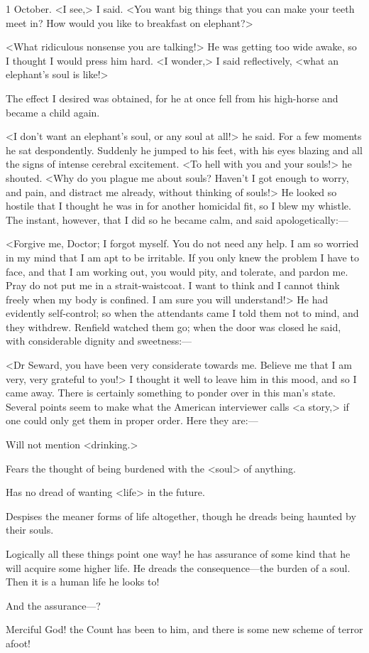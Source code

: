 \begin{diary}{1 October.}
<I see,> I said. <You want big things that you can make your teeth meet in? How would you like to breakfast on elephant?>

<What ridiculous nonsense you are talking!> He was getting too wide awake, so I thought I would press him hard. <I wonder,> I said reflectively, <what an elephant's soul is like!>

The effect I desired was obtained, for he at once fell from his high-horse and became a child again.

<I don't want an elephant's soul, or any soul at all!> he said. For a few moments he sat despondently. Suddenly he jumped to his feet, with his eyes blazing and all the signs of intense cerebral excitement. <To hell with you and your souls!> he shouted. <Why do you plague me about souls? Haven't I got enough to worry, and pain, and distract me already, without thinking of souls!> He looked so hostile that I thought he was in for another homicidal fit, so I blew my whistle. The instant, however, that I did so he became calm, and said apologetically:—

<Forgive me, Doctor; I forgot myself. You do not need any help. I am so worried in my mind that I am apt to be irritable. If you only knew the problem I have to face, and that I am working out, you would pity, and tolerate, and pardon me. Pray do not put me in a strait-waistcoat. I want to think and I cannot think freely when my body is confined. I am sure you will understand!> He had evidently self-control; so when the attendants came I told them not to mind, and they withdrew. Renfield watched them go; when the door was closed he said, with considerable dignity and sweetness:—

<Dr Seward, you have been very considerate towards me. Believe me that I am very, very grateful to you!> I thought it well to leave him in this mood, and so I came away. There is certainly something to ponder over in this man's state. Several points seem to make what the American interviewer calls <a story,> if one could only get them in proper order. Here they are:—

Will not mention <drinking.>

Fears the thought of being burdened with the <soul> of anything.

Has no dread of wanting <life> in the future.

Despises the meaner forms of life altogether, though he dreads being haunted by their souls.

Logically all these things point one way! he has assurance of some kind that he will acquire some higher life. He dreads the consequence—the burden of a soul. Then it is a human life he looks to!

And the assurance—?

Merciful God! the Count has been to him, and there is some new scheme of terror afoot!
\end{diary}
 

